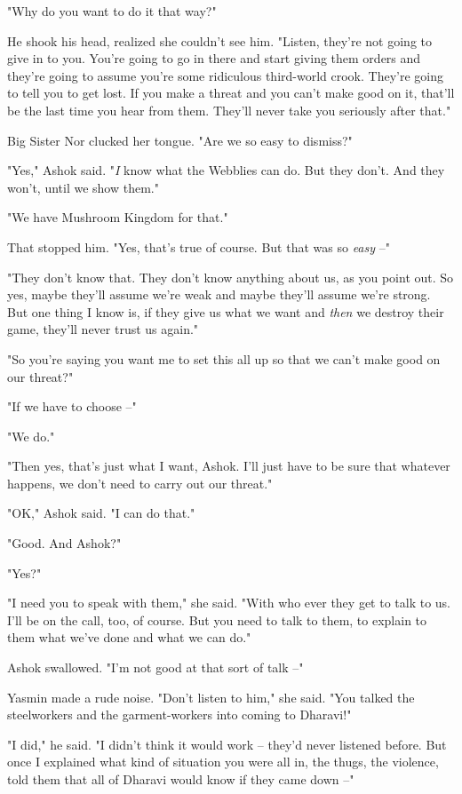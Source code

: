 "Why do you want to do it that way?"

He shook his head, realized she couldn't see him. "Listen, they're
not going to give in to you. You're going to go in there and start
giving them orders and they're going to assume you're some
ridiculous third-world crook. They're going to tell you to get
lost. If you make a threat and you can't make good on it, that'll
be the last time you hear from them. They'll never take you
seriously after that."

Big Sister Nor clucked her tongue. "Are we so easy to dismiss?"

"Yes," Ashok said. "\emph{I} know what the Webblies can do. But
they don't. And they won't, until we show them."

"We have Mushroom Kingdom for that."

That stopped him. "Yes, that's true of course. But that was so
\emph{easy} --"

"They don't know that. They don't know anything about us, as you
point out. So yes, maybe they'll assume we're weak and maybe
they'll assume we're strong. But one thing I know is, if they give
us what we want and \emph{then} we destroy their game, they'll
never trust us again."

"So you're saying you want me to set this all up so that we can't
make good on our threat?"

"If we have to choose --"

"We do."

"Then yes, that's just what I want, Ashok. I'll just have to be
sure that whatever happens, we don't need to carry out our
threat."

"OK," Ashok said. "I can do that."

"Good. And Ashok?"

"Yes?"

"I need you to speak with them," she said. "With who ever they get
to talk to us. I'll be on the call, too, of course. But you need to
talk to them, to explain to them what we've done and what we can
do."

Ashok swallowed. "I'm not good at that sort of talk --"

Yasmin made a rude noise. "Don't listen to him," she said. "You
talked the steelworkers and the garment-workers into coming to
Dharavi!"

"I did," he said. "I didn't think it would work -- they'd never
listened before. But once I explained what kind of situation you
were all in, the thugs, the violence, told them that all of Dharavi
would know if they came down --"

